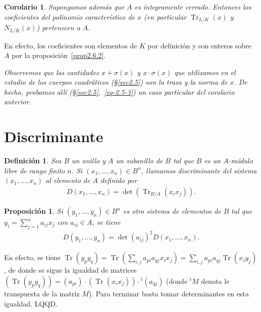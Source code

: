 \documentclass[bibtotoc,leqno,spanish]{amsbook}
\newcommand{\QED}{LQQD.}
\DeclareMathOperator{\Tr}{Tr}
\numberwithin{equation}{section}
\newenvironment{comm}%
	{\begin{list}{}{\setlength{\leftmargin}{2\parindent}\setlength{\topsep}{\baselineskip}}\item\itshape}
	{\end{list}}
\theoremstyle{note}
\newtheorem{definition}{Definici\'on}
\theoremstyle{note}
\newtheorem{proposition}{Proposici\'on}
\newtheorem*{corollary*}{Corolario}
\theoremstyle{rem}
\numberwithin{theorem}{section}
\numberwithin{proposition}{section}
\numberwithin{definition}{section}
\numberwithin{lemma}{section}
\numberwithin{corollary}{section}
\numberwithin{example}{section}
\numberwithin{footnote}{section}%
\begin{document}
\begin{corollary*}
Supongamos adem\'as que $A$ es \'integramente cerrado. Entonces los coeficientes del polinomio caracter\'istico
de $x$ (en particular $\Tr_{L/K}(x)$ y $N_{L/K}(x)$) pertenecen a $A$.
\end{corollary*}

En efecto, los coeficientes son elementos de $K$ por definici\'on y son enteros sobre $A$ por la proposici\'on~\ref{prop2.6.2}.

\begin{comm}
Observemos que las cantidades $x+\sigma(x)$ y $x\cdot\sigma(x)$ que utilizamos en el estudio de los
cuerpos cuadr\'aticos (\S\ref{sec2.5}) son la traza y la norma de $x$. De hecho, probamos all\'i (\S\ref{sec2.5},~\eqref{eq-2.5-3})
un caso particular del corolario anterior.
\end{comm}

\section{Discriminante}\label{sec2.7}

\begin{definition}\label{def2.7.1}
Sea $B$ un anillo y $A$ un subanillo de $B$ tal que $B$ es un $A$-m\'odulo libre de rango finito $n$.
Si $(x_{1},\dots,x_{n})\in B^{n}$, llamamos discriminante del sistema $(x_{1},\dots,x_{n})$ al elemento
de $A$ definido por
\begin{gather}
D(x_{1},\dots,x_{n}) = \det(\Tr_{B/A}(x_{i}x_{j})).
\end{gather}
\end{definition}

\begin{proposition}\label{prop2.7.1}
Si $(y_{1},\dots,y_{n})\in B^{n}$ es otro sistema de elementos de $B$ tal que $y_{i} = \sum_{j=1}^{n}a_{ij}x_{j}$
con $a_{ij}\in A$, se tiene
\begin{gather}
D(y_{1},\dots,y_{n}) = \det(a_{ij})^{2}D(x_{1},\dots,x_{n}).
\end{gather}
\end{proposition}

En efecto, se tiene $\Tr(y_{p}y_{q}) = \Tr\left(\sum_{i,j}a_{pi}a_{qj}x_{i}x_{j}\right) = \sum_{i,j}a_{pi}a_{qj}
\Tr(x_{i}y_{j})$, de donde se sigue la igualdad de matrices
$(\Tr(y_{p}y_{q})) = (a_{pi})\cdot(\Tr(x_{i}x_{j}))\cdot{}^{t}(a_{qj})$ (donde ${}^{t}M$ denota le transpuesta de la
matriz $M$). Para terminar basta tomar determinantes en esta igualdad. \QED
\end{document}
